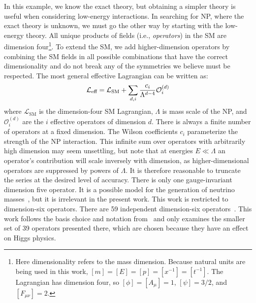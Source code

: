 In this example, we know the exact theory, but obtaining a simpler theory is
useful when considering low-energy interactions. In searching for NP, where the
exact theory is unknown, we must go the other way by starting with the
low-energy theory. All unique products of fields (i.e., \emph{operators}) in the
SM are dimension four\footnote{Here dimensionality refers to the mass dimension.
Because natural units are being used in this work, $[m] = [E] = [p] = [x^{-1}] =
[t^{-1}]$. The Lagrangian has dimension four, so $[\phi]=[A_\mu]=1$,
$[\psi]=3/2$, and $[F_{\mu\nu}]=2$.}. To extend the SM, we add higher-dimension
operators by combining the SM fields in all possible combinations that have the
correct dimensionality and do not break any of the symmetries we believe must be
respected. The most general effective Lagrangian can be written as:
\begin{equation}
\mathcal{L}_{\textup{eff}} = \mathcal{L}_{\textup{SM}} + \sum_{d,i} \frac{c_i}{\Lambda^{d-4}} \mathcal{O}^{(d)}_i
\end{equation}
where $\mathcal{L}_{\textrm{SM}}$ is the dimension-four SM Lagrangian, $\Lambda$
is mass scale of the NP, and $\mathcal{O}^{(d)}_i$ are the $i$ effective
operators of dimension $d$. There is always a finite number of operators at a
fixed dimension. The Wilson coefficients $c_i$ parameterize the strength of the
NP interaction. This infinite sum over operators with arbitrarily high dimension
may seem unsettling, but note that at energies $E \ll \Lambda$ an operator's
contribution will scale inversely with dimension, as higher-dimensional
operators are suppressed by powers of $\Lambda$. It is therefore reasonable to
truncate the series at the desired level of accuracy. There is only one
gauge-invariant dimension five operator. It is a possible model for the
generation of neutrino masses~\cite{PhysRevLett.43.1566}, but it is irrelevant
in the present work. This work is restricted to dimension-six operators. There
are 59 independent dimension-six operators~\cite{Grzadkowski:2010es}. This work
follows the basis choice and notation from~\cite{Alloul2014} and only examines
the smaller set of 39 operators presented there, which are chosen because they
have an effect on Higgs physics.

